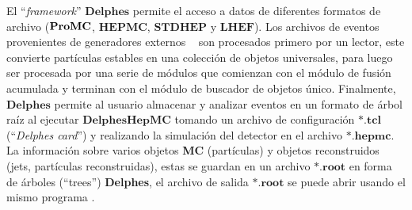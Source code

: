 El ``\textit{framework}'' $\mathbf{Delphes}$ permite el acceso a datos de diferentes formatos de archivo ($\mathbf{Pro}\-\mathbf{MC}$, $\mathbf{HEPMC}$, $\mathbf{STDHEP}$ y $\mathbf{LHEF}$). Los archivos de eventos provenientes de generadores externos \MC ~ son procesados primero por un lector, este convierte partículas estables en una colección de objetos universales, para luego ser procesada por una serie de módulos que comienzan con el módulo de fusión acumulada y terminan con el módulo de buscador de objetos único. Finalmente,  $\mathbf{Delphes}$ permite al usuario almacenar y analizar eventos en un formato de árbol raíz al ejecutar  $\mathbf{DelphesHepMC}$ tomando un archivo de configuración $\mathbf{*.tcl}$(``\textit{Delphes card}'') y realizando la simulación del detector en el archivo $\mathbf{*.hepmc}$. La información sobre varios objetos \textbf{MC} (partículas) y objetos reconstruidos (jets, partículas reconstruidas), estas se guardan en un archivo $\mathbf{*.root}$ en forma de árboles (``trees'')  \textbf{Delphes}, el archivo de salida $\mathbf{*.root}$ se puede abrir usando el mismo programa \ROOT.



